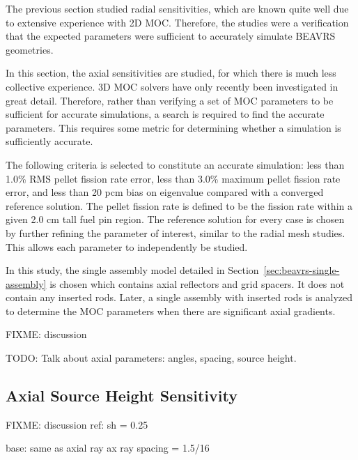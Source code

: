 The previous section studied radial sensitivities, which are known quite well due to extensive experience with 2D \ac{MOC}. Therefore, the studies were a verification that the expected parameters were sufficient to accurately simulate BEAVRS geometries. 

In this section, the axial sensitivities are studied, for which there is much less collective experience. 3D \ac{MOC} solvers have only recently been investigated in great detail. Therefore, rather than verifying a set of \ac{MOC} parameters to be sufficient for accurate simulations, a search is required to find the accurate parameters. This requires some metric for determining whether a simulation is sufficiently accurate.

The following criteria is selected to constitute an accurate simulation: less than 1.0\% RMS pellet fission rate error, less than 3.0\% maximum pellet fission rate error, and less than 20 pcm bias on eigenvalue compared with a converged reference solution. The pellet fission rate is defined to be the fission rate within a given 2.0 cm tall fuel pin region. The reference solution for every case is chosen by further refining the parameter of interest, similar to the radial mesh studies. This allows each parameter to independently be studied.

In this study, the single assembly model detailed in Section~\ref{sec:beavrs-single-assembly} is chosen which contains axial reflectors and grid spacers. It does not contain any inserted rods. Later, a single assembly with inserted rods is analyzed to determine the \ac{MOC} parameters when there are significant axial gradients.

FIXME: discussion

TODO: Talk about axial parameters: angles, spacing, source height.

\subsection{Axial Source Height Sensitivity}

FIXME: discussion
ref: sh = 0.25

base: same as axial ray
ax ray spacing = 1.5/16




